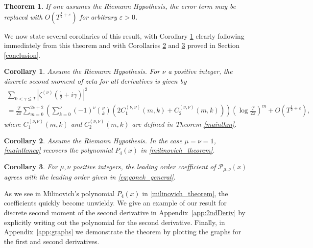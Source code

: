 \documentclass[12pt, a4paper,reqno]{amsart}
\newtheorem{theorem}{Theorem}
\newtheorem{corollary}{Corollary}
\theoremstyle{definition}
\numberwithin{equation}{section}
\begin{document}
\begin{theorem}
If one assumes the Riemann Hypothesis, the error term may be replaced with $O\left(T^{\frac{1}{2}+\varepsilon}\right)$ for arbitrary $\varepsilon>0$.
\end{theorem}

We now state several corollaries of this result, with Corollary \ref{cor:higher_derivs_milinovich} clearly following immediately from this theorem and with Corollaries \ref{cor:micah} and \ref{corollary:general} proved in Section \ref{conclusion}.

\begin{corollary}\label{cor:higher_derivs_milinovich}
    Assume the Riemann Hypothesis. For $\nu$ a positive integer, the discrete second moment of zeta for all derivatives is given by
    \begin{multline*}
        \sum_{0<\gamma\le T}\left|\zeta^{(\nu)}\left(\frac{1}{2}+i\gamma\right)\right|^2
        \\=\frac{T}{2\pi} \sum_{m=0}^{2\nu+2} \left( \sum_{k=0}^{\nu} (-1)^{\nu} \binom{\nu}{k}  \left(2C_1^{(\nu,\nu)}(m,k)+C_2^{(\nu,\nu)}(m,k)\right) \right) \left(\log\frac{T}{2\pi}\right)^m + O\left(T^{\frac{1}{2}+\varepsilon}\right),
    \end{multline*}
    where $C_1^{(\nu,\nu)}(m,k)$ and $C_2^{(\nu,\nu)}(m,k)$ are defined in Theorem \ref{mainthm}.

\end{corollary}

\begin{corollary} \label{cor:micah}
    Assume the Riemann Hypothesis. In the case $\mu=\nu=1$, \eqref{mainthmeq} recovers the polynomial $P_4(x)$ in \eqref{milinovich_theorem}.
\end{corollary}


\begin{corollary}\label{corollary:general}
    For $\mu,\nu$ positive integers, the leading order coefficient of $\mathcal{P}_{\mu,\nu}(x)$ agrees with the leading order given in \eqref{eq:gonek_general}.
\end{corollary}


As we see in Milinovich's polynomial $P_4(x)$ in \eqref{milinovich_theorem}, the coefficients quickly become unwieldy. We give an example of our result for discrete second moment of the second derivative in Appendix~\ref{app:2ndDeriv} by explicitly writing out the polynomial for the second derivative. Finally, in Appendix~\ref{app:graphs} we demonstrate the theorem by plotting the graphs for the first and second derivatives.
\end{document}
